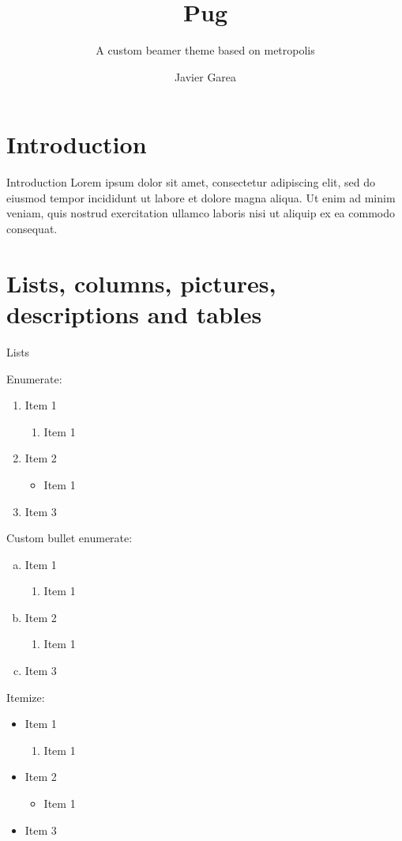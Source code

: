 \documentclass[aspectratio=169]{beamer}
\title{Pug}
\subtitle{A custom beamer theme based on metropolis}
\author{Javier Garea}
\institute{University of \LaTeX}
\newcommand{\lorem}{Lorem ipsum dolor sit amet, consectetur adipiscing elit, sed do eiusmod tempor incididunt ut labore et dolore magna aliqua. Ut enim ad minim veniam, quis nostrud exercitation ullamco laboris nisi ut aliquip ex ea commodo consequat.}
\begin{document}
\titleframe

\section{Introduction}
\begin{frame}{Introduction}
    \lorem
\end{frame}

\section{Lists, columns, pictures, descriptions and tables}
\begin{frame}{Lists}
\begin{multicols}{2}
    Enumerate:
    \begin{enumerate}
        \item Item 1
            \begin{enumerate}
                \item Item 1
            \end{enumerate}
        \item Item 2
            \begin{itemize}
                \item Item 1
            \end{itemize}
        \item Item 3
    \end{enumerate}
    
    Custom bullet enumerate:
    \begin{enumerate}[a)]
        \item Item 1
            \begin{enumerate}[I]
                \item Item 1
            \end{enumerate}
        \item Item 2
            \begin{enumerate}[i]
                \item Item 1
            \end{enumerate}
        \item Item 3
    \end{enumerate}
\end{multicols}

Itemize:
\begin{itemize}
    \item Item 1
        \begin{enumerate}
                \item Item 1
            \end{enumerate}
    \item Item 2
        \begin{itemize}
            \item Item 1
        \end{itemize}
    \item Item 3
\end{itemize}
\end{frame}
\end{document}
